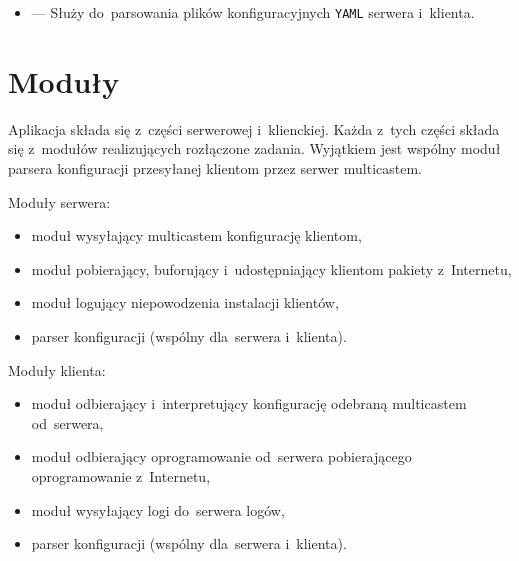 \documentclass[thesis]{subfiles}
\begin{document}
\begin{itemize}
	\item {} --- Służy do~parsowania plików konfiguracyjnych \texttt{YAML} serwera i~klienta.
\end{itemize}


\section{Moduły}

Aplikacja składa się z~części serwerowej i~klienckiej. Każda z~tych części składa się z~modułów realizujących rozłączone zadania. Wyjątkiem jest wspólny moduł parsera konfiguracji przesyłanej klientom przez serwer multicastem.

Moduły serwera:\mynobreakpar
\begin{itemize}
	\item moduł wysyłający multicastem konfigurację klientom,
	\item moduł pobierający, buforujący i~udostępniający klientom pakiety z~Internetu,
	\item moduł logujący niepowodzenia instalacji klientów,
	\item parser konfiguracji (wspólny dla~serwera i~klienta).
\end{itemize}

Moduły klienta:\mynobreakpar
\begin{itemize}
	\item moduł odbierający i~interpretujący konfigurację odebraną multicastem od~serwera,
	\item moduł odbierający oprogramowanie od~serwera pobierającego oprogramowanie z~Internetu,
	\item moduł wysyłający logi do~serwera logów,
	\item parser konfiguracji (wspólny dla~serwera i~klienta).
\end{itemize}

%
%
\end{document}
